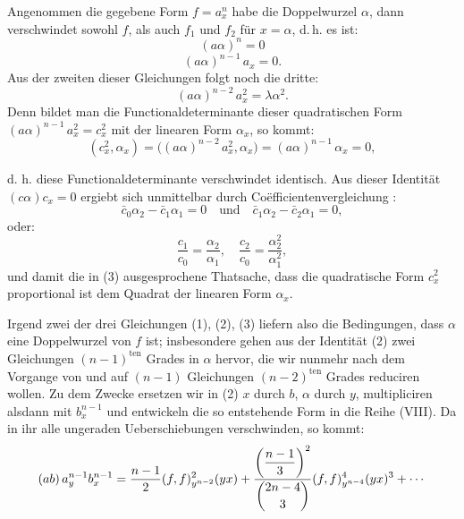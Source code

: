 \documentclass[11pt]{article}
\providecommand{\gesperrt}[1]{\textls[130]{#1}}
\providecommand{\weberpage}[1]{}
\providecommand{\weq}[2]{\begin{equation}\tag{#1}#2\end{equation}}
\begin{document}
Angenommen die gegebene Form $f = a_x^n$ habe die Doppelwurzel
$\alpha$, dann verschwindet sowohl $f$, als auch $f_1$ und $f_2$ für $x = \alpha$, d.\,h.
es ist:
\weq{1}{(a\alpha)^n = 0}
\weq{2}{(a\alpha)^{n-1}\,a_x = 0.}
Aus der zweiten dieser Gleichungen folgt noch die dritte:
\weq{3}{(a\alpha)^{n-2}\,a_x^2 = \lambda \alpha^2.}
Denn bildet man die Functionaldeterminante dieser quadratischen
Form $(a\alpha)^{n-1}\,a_x^2 = c_x^2$ mit der linearen Form $\alpha_x$, so kommt:
\[
(c_x^2, \alpha_x) = \big((a\alpha)^{n-2}\,a_x^2, \alpha_x\big) = (a\alpha)^{n-1}\,\alpha_x = 0,
\]


\weberpage{109}
d. h. diese Functionaldeterminante verschwindet identisch. Aus dieser
Identität $(c\alpha)c_x = 0$ ergiebt sich unmittelbar durch Co\"efficientenvergleichung
:
\[
\bar{c}_0\alpha_2 - \bar{c}_1\alpha_1 = 0 \quad \text{und} \quad \bar{c}_1\alpha_2 - \bar{c}_2\alpha_1 = 0,
\]
oder:
\[
\frac{c_1}{c_0} = \frac{\alpha_2}{\alpha_1}, \quad \frac{c_2}{c_0} = \frac{\alpha_2^2}{\alpha_1^2},
\]
und damit die in (3) ausgesprochene Thatsache, dass die quadratische
Form $c_x^2$ proportional ist dem Quadrat der linearen Form $\alpha_x$.

Irgend zwei der drei Gleichungen (1), (2), (3) liefern also die
Bedingungen, dass $\alpha$ eine Doppelwurzel von $f$ ist; insbesondere gehen
aus der Identität (2) zwei Gleichungen $(n-1)^{\text{ten}}$ Grades in $\alpha$ hervor,
die wir nunmehr nach dem Vorgange von \gesperrt{Cayley} und \gesperrt{B\'ezout} auf
$(n-1)$ Gleichungen $(n-2)^{\text{ten}}$ Grades reduciren wollen. Zu dem Zwecke
ersetzen wir in (2) $x$ durch $b$, $\alpha$ durch $y$, multipliciren alsdann mit
$b_x^{n-1}$ und entwickeln die so entstehende Form in die Reihe (VIII).
Da in ihr alle ungeraden Ueberschiebungen verschwinden, so kommt:
\[
(ab)\,a_y^{n-1}b_x^{n-1} = \frac{n-1}{2}(f,f)^2_{y^{n-2}}(yx) + \frac{\left(\dfrac{n-1}{3}\right)^2}{\dbinom{2n-4}{3}}(f,f)^4_{y^{n-4}}(yx)^3 + \cdots
\]
\end{document}
